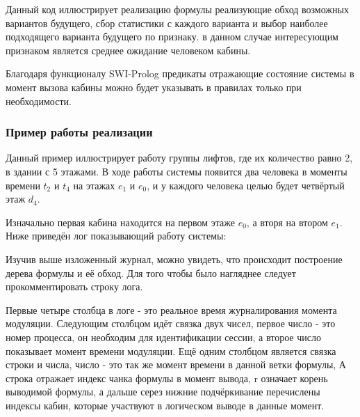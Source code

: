 			Данный код иллюстрирует реализацию формулы реализующие обход возможных вариантов будущего, сбор статистики с каждого варианта и выбор наиболее подходящего варианта будущего по признаку. в данном случае интересующим признаком является среднее ожидание человеком кабины. 

% 

	Благодаря функционалу SWI-Prolog
		предикаты отражающие состояние системы в момент вызова кабины можно будет указывать в правилах только при необходимости.

		\subsubsection{Пример работы реализации}

	Данный пример иллюстрирует работу группы лифтов, где их количество равно 2, в здании с 5 этажами.
		В ходе работы системы появится два человека в моменты времени $t_2$ и $t_4$ на этажах $e_1$ и $e_0$,
		и у каждого человека целью будет четвёртый этаж $d_4$.

	Изначально первая кабина находится на первом этаже $e_0$, а вторя на втором $e_1$.
		Ниже приведён лог показывающий работу системы:


Изучив выше изложенный журнал, можно увидеть, что происходит построение дерева формулы и её обход.
	Для того чтобы было нагляднее следует прокомментировать строку лога.

Первые четыре столбца в логе - это реальное время журналирования момента модуляции.
	Следующим столбцом идёт связка двух чисел, первое число - это номер процесса,
	он необходим для идентификации сессии, а второе число показывает момент времени модуляции.
	Ещё одним столбцом является связка строки и числа, число - это так же момент времени в данной ветки формулы,
	А строка отражает индекс чанка формулы в момент вывода, r означает корень выводимой формулы, а дальше серез нижние подчёркивание перечислены индексы кабин, которые участвуют в логическом выводе в данные момент.

